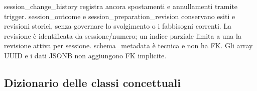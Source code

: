 \documentclass[11pt,a4paper]{article}
\begin{document}
\begin{landscape}
\begin{center}
\begin{minipage}{\linewidth}
\label{fig:restructured-history}
\end{minipage}\end{center}
{\small session\_change\_history registra ancora spostamenti e annullamenti tramite trigger. session\_outcome e session\_preparation\_revision conservano esiti e revisioni storici, senza governare lo svolgimento o i fabbisogni correnti. La revisione è identificata da sessione/numero; un indice parziale limita a una la revisione attiva per sessione. schema\_metadata è tecnica e non ha FK. Gli array UUID e i dati JSONB non aggiungono FK implicite.}
\end{landscape}

\subsection{Dizionario delle classi concettuali}\label{sec:conceptual-dictionary}
\end{document}
